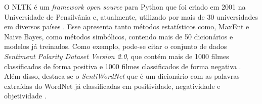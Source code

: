 O \ac{NLTK} é um \textit{framework open source} para Python que foi
criado em 2001 na Universidade de Pensilvânia e, atualmente, utilizado por mais
de 30 universidades em diversos
países \cite{nltk}.
Esse apresenta tanto métodos estatísticos como, \ac{MaxEnt} e Naive Bayes, como
métodos simbólicos, contendo mais de 50 dicionários e modelos já treinados.
Como exemplo, pode-se citar o conjunto de dados \textit{Sentiment
Polarity Dataset Version 2.0}, que contém mais de 1000 filmes classificados de
forma positiva e 1000 filmes classificados de forma negativa
\cite{Pang:2002:TUS:1118693.1118704}.
Além disso, destaca-se o \textit{SentiWordNet} que é um dicionário com as
palavras extraídas do WordNet já classificadas em positividade, negatividade e objetividade \cite{Esuli2006sentiwordnet}.

